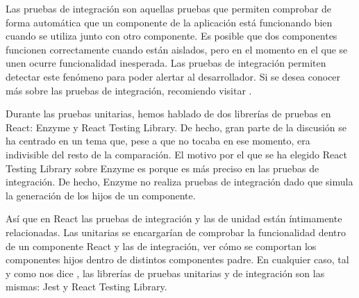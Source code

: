Las pruebas de integración son aquellas pruebas que permiten comprobar de forma automática que un componente de la aplicación está funcionando bien cuando se utiliza junto con otro componente. Es posible que dos componentes funcionen correctamente cuando están aislados, pero en el momento en el que se unen ocurre funcionalidad inesperada. Las pruebas de integración permiten detectar este fenómeno para poder alertar al desarrollador. Si se desea conocer más sobre las pruebas de integración, recomiendo visitar \citet{DZITWH}.

Durante las pruebas unitarias, hemos hablado de dos librerías de pruebas en React: Enzyme y React Testing Library. De hecho, gran parte de la discusión se ha centrado en un tema que, pese a que no tocaba en ese momento, era indivisible del resto de la comparación. El motivo por el que se ha elegido React Testing Library sobre Enzyme es porque es más preciso en las pruebas de integración. De hecho, Enzyme no realiza pruebas de integración dado que simula la generación de los hijos de un componente.

Así que en React las pruebas de integración y las de unidad están íntimamente relacionadas. Las unitarias se encargarían de comprobar la funcionalidad dentro de un componente React y las de integración, ver cómo se comportan los componentes hijos dentro de distintos componentes padre. En cualquier caso, tal y como nos dice \citet{RECTIT}, las librerías de pruebas unitarias y de integración son las mismas: Jest y React Testing Library.